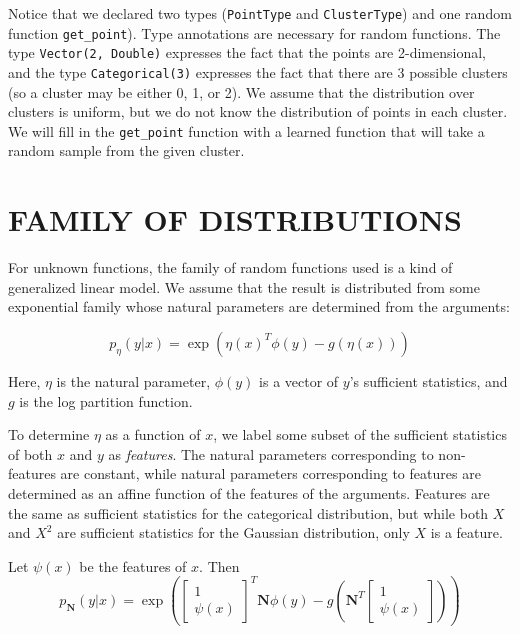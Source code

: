 \documentclass[proceed]{article}
\begin{document}
  Notice that we declared two types (\texttt{PointType} and \texttt{ClusterType})
  and one random function \texttt{get\_point}).
  Type annotations are necessary for random functions.  The type
  \texttt{Vector(2, Double)} expresses the fact that the points are 2-dimensional,
  and the type \texttt{Categorical(3)} expresses the fact that there are 3
  possible clusters (so a cluster may be either 0, 1, or 2).  We assume that
  the distribution over clusters is uniform, but we do not know the distribution
  of points in each cluster.
  We will fill in the
  \texttt{get\_point} function with a learned function that will take a random
  sample from the given cluster.

  \section{FAMILY OF DISTRIBUTIONS}
  
  For unknown functions, the family of random functions used is a kind
    of generalized linear model.  We assume that the result
    is distributed from some exponential family whose natural
    parameters are determined from the arguments:

    $$p_{\eta}(y | x) = \exp\left(\eta(x)^T \phi(y) - g(\eta(x))\right)$$

    Here, $\eta$ is the natural parameter, $\phi(y)$ is a vector of $y$'s sufficient statistics,
    and $g$ is the log partition function.

    To determine $\eta$ as a function of $x$, we label
    some subset of the sufficient statistics of both $x$ and $y$ as \emph{features}.  The natural
    parameters corresponding to non-features are constant, while natural
    parameters corresponding to features are determined as an affine
    function of the features of the arguments.  Features are the same as sufficient
    statistics for the categorical distribution, but while both $X$ and $X^2$ are
    sufficient statistics for the Gaussian distribution, only $X$ is a feature.

    Let $\psi(x)$ be the features of $x$.  Then
    $$p_{\mathbf{N}}(y | x) = \exp\left(\begin{bmatrix} 1 \\ \psi(x) \end{bmatrix} ^T \mathbf{N} \phi(y) - g\left(\mathbf{N}^T \begin{bmatrix} 1 \\ \psi(x) \end{bmatrix}\right)\right)$$
\end{document}
